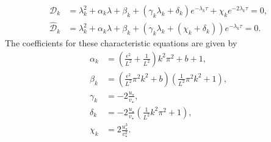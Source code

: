 \begin{align}\label{characf1}
\mathcal{D}_k&=\lambda_k^2+\alpha_k\lambda+\beta_k+(\gamma_k\lambda_k+\delta_k)e^{-\lambda_k\tau}+\chi_ke^{-2\lambda_k\tau}=0,\\
\hat{\mathcal{D}}_k&=\lambda_k^2+\alpha_k\lambda+\beta_k+(\gamma_k\lambda_k+(\chi_k+\delta_k))e^{-\lambda_k\tau}=0.\label{characf2}
\end{align}
The coefficients for these characteristic equations are given by
\begin{equation}
    \begin{split}
\alpha_k&=\left(\frac{\epsilon^2}{L^2}+\frac{1}{L^2}\right)k^2\pi^2+b+1,\\
\beta_k&=\left(\frac{\epsilon^2}{L^2}\pi^2k^2+b\right)\left(\frac{1}{L^2}\pi^2k^2+1\right),\\
\gamma_k&=-2\frac{u_\star}{v_\star},\\
\delta_k&=-2\frac{u_\star}{v_\star}\left(\frac{1}{L^2}k^2\pi^2+1\right),\\
\chi_k&=2\frac{u_\star^3}{v_\star^2}.
    \end{split}
\end{equation}

